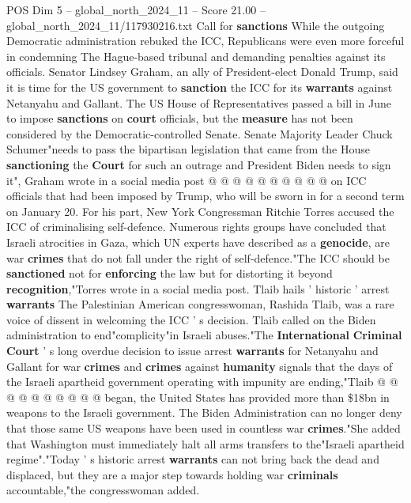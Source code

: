 \begin{textsample}{POS Dim 5 – global\_north\_2024\_11 – Score 21.00 – global\_north\_2024\_11/117930216.txt}
Call for \textbf{sanctions} While the outgoing Democratic administration rebuked the ICC, Republicans were even more forceful in condemning The Hague-based tribunal and demanding penalties against its officials.
Senator Lindsey Graham, an ally of President-elect Donald Trump, said it is time for the US government to \textbf{sanction} the ICC for its \textbf{warrants} against Netanyahu and Gallant.
The US House of Representatives passed a bill in June to impose \textbf{sanctions} on \textbf{court} officials, but the \textbf{measure} has not been considered by the Democratic-controlled Senate.
Senate Majority Leader Chuck Schumer"needs to pass the bipartisan legislation that came from the House \textbf{sanctioning} the \textbf{Court} for such an outrage and President Biden needs to sign it", Graham wrote in a social media post @ @ @ @ @ @ @ @ @ @ on ICC officials that had been imposed by Trump, who will be sworn in for a second term on January 20.
For his part, New York Congressman Ritchie Torres accused the ICC of criminalising self-defence.
Numerous rights groups have concluded that Israeli atrocities in Gaza, which UN experts have described as a \textbf{genocide}, are war \textbf{crimes} that do not fall under the right of self-defence."The ICC should be \textbf{sanctioned} not for \textbf{enforcing} the law but for distorting it beyond \textbf{recognition},"Torres wrote in a social media post.
Tlaib hails ' historic ' arrest \textbf{warrants} The Palestinian American congresswoman, Rashida Tlaib, was a rare voice of dissent in welcoming the ICC ' s decision.
Tlaib called on the Biden administration to end"complicity"in Israeli abuses."The \textbf{International} \textbf{Criminal} \textbf{Court} ' s long overdue decision to issue arrest \textbf{warrants} for Netanyahu and Gallant for war \textbf{crimes} and \textbf{crimes} against \textbf{humanity} signals that the days of the Israeli apartheid government operating with impunity are ending,"Tlaib @ @ @ @ @ @ @ @ @ @ began, the United States has provided more than \$18bn in weapons to the Israeli government.
The Biden Administration can no longer deny that those same US weapons have been used in countless war \textbf{crimes}."She added that Washington must immediately halt all arms transfers to the"Israeli apartheid regime"."Today ' s historic arrest \textbf{warrants} can not bring back the dead and displaced, but they are a major step towards holding war \textbf{criminals} accountable,"the congresswoman added.

\end{textsample}
